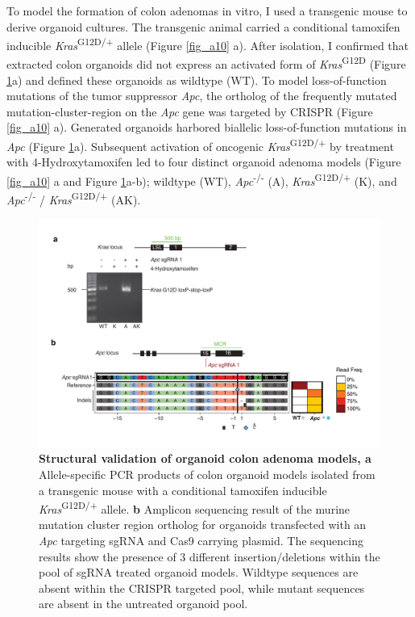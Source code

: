 \begin{flushleft}
To model the formation of colon adenomas in vitro, I used a transgenic mouse to derive organoid cultures. The transgenic animal carried a conditional tamoxifen inducible \textit{Kras}\textsuperscript{G12D/+} allele \citep{jacksonAnalysisLungTumor2001} (Figure \ref{fig_a10} a). After isolation, I confirmed that extracted colon organoids did not express an activated form of \textit{Kras}\textsuperscript{G12D} (Figure \ref{fig_a11}a) and defined these organoids as wildtype (WT). To model loss-of-function mutations of the tumor suppressor \textit{Apc}, the ortholog of the frequently mutated mutation-cluster-region on the \textit{Apc} gene was targeted by CRISPR (Figure \ref{fig_a10} a). Generated organoids harbored biallelic loss-of-function mutations in \textit{Apc} (Figure \ref{fig_a11}a). Subsequent activation of oncogenic \textit{Kras}\textsuperscript{G12D/+} by treatment with 4-Hydroxytamoxifen led to four distinct organoid adenoma models (Figure \ref{fig_a10} a and Figure \ref{fig_a11}a-b); wildtype (WT), \textit{Apc}\textsuperscript{-/-}
  (A), \textit{Kras}\textsuperscript{G12D/+} (K), and \textit{Apc}\textsuperscript{-/-} / \textit{Kras}\textsuperscript{G12D/+} (AK).


\begin{figure}[h]
\centering
\includegraphics[width=\textwidth,
                height=\textheight,
                keepaspectratio]{figures/adenomaprofiling/pdf/fig_1_1.pdf}
\caption[Structural validation of organoid colon adenoma models]{\textbf{Structural validation of organoid colon adenoma models, a} Allele-specific PCR products of colon organoid models isolated from a transgenic mouse with a conditional tamoxifen inducible \textit{Kras}\textsuperscript{G12D/+} allele.
\textbf{b} Amplicon sequencing result of the murine mutation cluster region ortholog for organoids transfected with an \textit{Apc} targeting sgRNA and Cas9 carrying plasmid. The sequencing results show the presence of 3 different insertion/deletions within the pool of sgRNA treated organoid models. Wildtype sequences are absent within the CRISPR targeted pool, while mutant sequences are absent in the untreated organoid pool.}
\label{fig_a11}
\end{figure}
\bigbreak


\end{flushleft}
